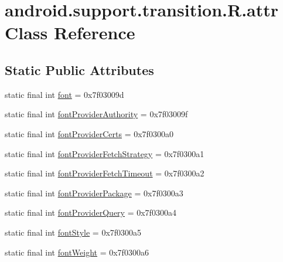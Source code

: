 \hypertarget{classandroid_1_1support_1_1transition_1_1R_1_1attr}{}\section{android.\+support.\+transition.\+R.\+attr Class Reference}
\label{classandroid_1_1support_1_1transition_1_1R_1_1attr}
\subsection*{Static Public Attributes}
\begin{DoxyCompactItemize}
\item 
static final int \mbox{\hyperlink{classandroid_1_1support_1_1transition_1_1R_1_1attr_a03e0b314e887f913bd1270d40202af3d}{font}} = 0x7f03009d
\item 
static final int \mbox{\hyperlink{classandroid_1_1support_1_1transition_1_1R_1_1attr_aca519f1967d5768069bf7355f3029826}{font\+Provider\+Authority}} = 0x7f03009f
\item 
static final int \mbox{\hyperlink{classandroid_1_1support_1_1transition_1_1R_1_1attr_a283a0f3186dbb719581e4c09bd9fa0e0}{font\+Provider\+Certs}} = 0x7f0300a0
\item 
static final int \mbox{\hyperlink{classandroid_1_1support_1_1transition_1_1R_1_1attr_ace530c6e0295a3d81d4bdbb53cd9448a}{font\+Provider\+Fetch\+Strategy}} = 0x7f0300a1
\item 
static final int \mbox{\hyperlink{classandroid_1_1support_1_1transition_1_1R_1_1attr_aff85f778cf905c9272b7f44512c8f106}{font\+Provider\+Fetch\+Timeout}} = 0x7f0300a2
\item 
static final int \mbox{\hyperlink{classandroid_1_1support_1_1transition_1_1R_1_1attr_af0b488678f459c82a364c3d556f006e7}{font\+Provider\+Package}} = 0x7f0300a3
\item 
static final int \mbox{\hyperlink{classandroid_1_1support_1_1transition_1_1R_1_1attr_acf825a0417d1c4ddf5cbd6794c986310}{font\+Provider\+Query}} = 0x7f0300a4
\item 
static final int \mbox{\hyperlink{classandroid_1_1support_1_1transition_1_1R_1_1attr_a36ada44c5dc7ab2aa0181a77dc193748}{font\+Style}} = 0x7f0300a5
\item 
static final int \mbox{\hyperlink{classandroid_1_1support_1_1transition_1_1R_1_1attr_a48e029a9c276df99715bd535d194d2ff}{font\+Weight}} = 0x7f0300a6
\end{DoxyCompactItemize}



